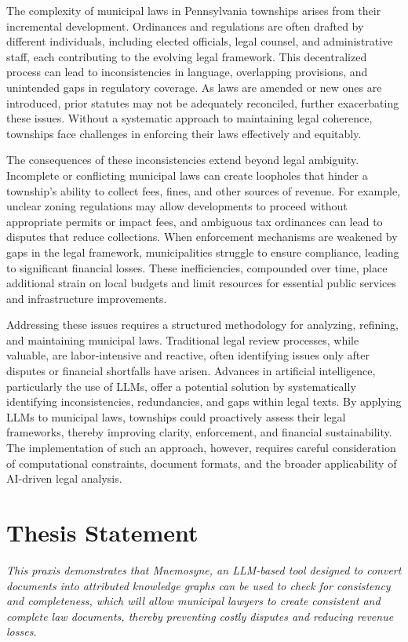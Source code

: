 The complexity of municipal laws in Pennsylvania townships arises from their incremental development. Ordinances and regulations are often drafted by different individuals, including elected officials, legal counsel, and administrative staff, each contributing to the evolving legal framework. This decentralized process can lead to inconsistencies in language, overlapping provisions, and unintended gaps in regulatory coverage. As laws are amended or new ones are introduced, prior statutes may not be adequately reconciled, further exacerbating these issues. Without a systematic approach to maintaining legal coherence, townships face challenges in enforcing their laws effectively and equitably.

The consequences of these inconsistencies extend beyond legal ambiguity. Incomplete or conflicting municipal laws can create loopholes that hinder a township’s ability to collect fees, fines, and other sources of revenue. For example, unclear zoning regulations may allow developments to proceed without appropriate permits or impact fees, and ambiguous tax ordinances can lead to disputes that reduce collections. When enforcement mechanisms are weakened by gaps in the legal framework, municipalities struggle to ensure compliance, leading to significant financial losses. These inefficiencies, compounded over time, place additional strain on local budgets and limit resources for essential public services and infrastructure improvements.

Addressing these issues requires a structured methodology for analyzing, refining, and maintaining municipal laws. Traditional legal review processes, while valuable, are labor-intensive and reactive, often identifying issues only after disputes or financial shortfalls have arisen. Advances in artificial intelligence, particularly the use of LLMs, offer a potential solution by systematically identifying inconsistencies, redundancies, and gaps within legal texts. By applying LLMs to municipal laws, townships could proactively assess their legal frameworks, thereby improving clarity, enforcement, and financial sustainability. The implementation of such an approach, however, requires careful consideration of computational constraints, document formats, and the broader applicability of AI-driven legal analysis.

\section{Thesis Statement}
\textit{This praxis demonstrates that Mnemosyne, an LLM-based tool designed to convert documents into attributed knowledge graphs can be used to check for consistency and completeness, which will allow municipal lawyers to create consistent and complete law documents, thereby preventing costly disputes and reducing revenue losses.}

